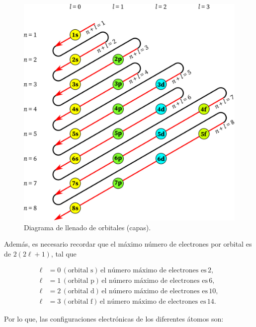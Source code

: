 \documentclass[./../main.tex]{subfiles}
\begin{document}
\begin{exercise}
\begin{solution}
            \begin{figure}[htb]
                \centering
                \includegraphics[scale=0.25]{1.LlenadoOrbitales}
                \caption{Diagrama de llenado de orbitales (capas).}
                \label{fig:llenado-de-orbitales}
            \end{figure}

            Además, es necesario recordar que el máximo número de electrones por orbital es de \(2(2\ell + 1)\), tal que

            \begin{align*}
                \ell &= 0 \,(\text{orbital s})\, \text{el número máximo de electrones es}\, 2,\\
                \ell &= 1 \,(\text{orbital p})\, \text{el número máximo de electrones es}\, 6,\\
                \ell &= 2 \,(\text{orbital d})\, \text{el número máximo de electrones es}\, 10,\\
                \ell &= 3 \,(\text{orbital f})\, \text{el número máximo de electrones es}\, 14.
            \end{align*}

            Por lo que, las configuraciones electrónicas de los diferentes átomos son:


\end{solution}
\end{exercise}
\end{document}
